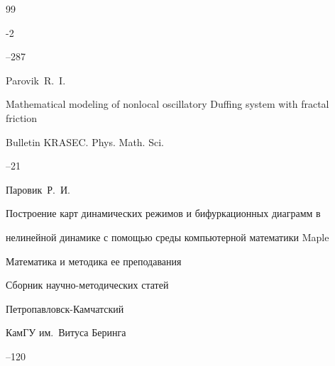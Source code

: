 \begin{thebibliography}{99}

-2

--287












\by Parovik~R.~I. 

\paper Mathematical modeling of nonlocal oscillatory Duffing system with fractal friction

\jour Bulletin KRASEC. Phys. Math. Sci.




–21





\by Паровик~Р.~И. 

\paper Построение карт динамических режимов и бифуркационных диаграмм в

нелинейной динамике с помощью среды компьютерной математики Maple

\inbook Математика и методика ее преподавания 

\bookinfo Сборник научно-методических статей

\publaddr Петропавловск-Камчатский

\publ КамГУ им.~Витуса Беринга


--120















\end{thebibliography}





